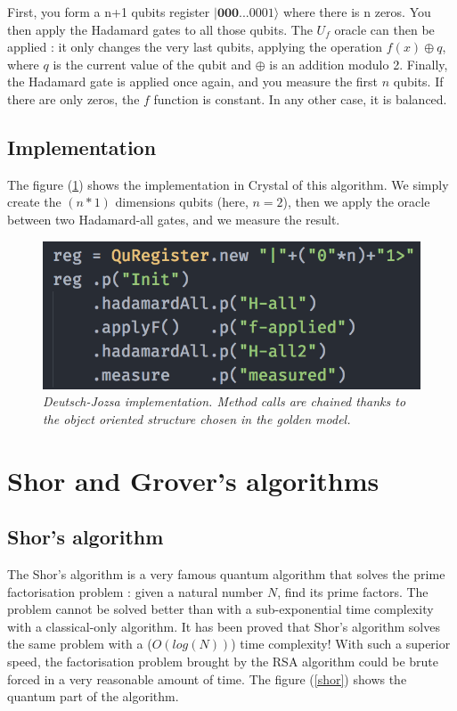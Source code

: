 \documentclass[a4paper,12pt]{report}
\newcommand{\quSt}[1]{\bm{|#1\rangle}}
\newcommand{\icite}[1]{\up{\textit{\cite{#1}}}}
\newcommand{\para}[1]{\par{#1}\\}
\begin{document}
\para{
    First, you form a n+1 qubits register $\quSt{000...0001}$ where there is n zeros. You then apply the Hadamard gates to all those qubits. The $U_f$ oracle can then be applied : it only changes the very last qubits, applying the operation $f(x) \oplus q$, where $q$ is the current value of the qubit and $\oplus$ is an addition modulo 2. Finally, the Hadamard gate is applied once again, and you measure the first $n$ qubits. If there are only zeros, the $f$ function is constant. In any other case, it is balanced.
}

        \subsection{Implementation}

\para{
    The figure (\ref{deutsch-implementation}) shows the implementation in Crystal of this algorithm. We simply create the $(n*1)$ dimensions qubits (here, $n = 2$), then we apply the oracle between two Hadamard-all gates, and we measure the result.
}

\begin{figure}[H]
	\begin{center}
		\includegraphics[scale=0.6]{images/deutsch-implementation}
	\end{center}
	\caption{\textit{Deutsch-Jozsa implementation. Method calls are chained thanks to the object oriented structure chosen in the golden model. }}
	\label{deutsch-implementation}
\end{figure}

    \section{Shor and Grover's algorithms}
        \subsection{Shor's algorithm}

\para{
    The Shor's algorithm\icite{bibli3} is a very famous quantum algorithm that solves the prime factorisation problem : given a natural number $N$, find its prime factors. The problem cannot be solved better than with a sub-exponential time complexity with a classical-only algorithm. It has been proved that Shor's algorithm solves the same problem with a ($O(log(N))$) time complexity! With such a superior speed, the factorisation problem brought by the RSA algorithm could be brute forced in a very reasonable amount of time. The figure (\ref{shor}) shows the quantum part of the algorithm.
}
\end{document}
